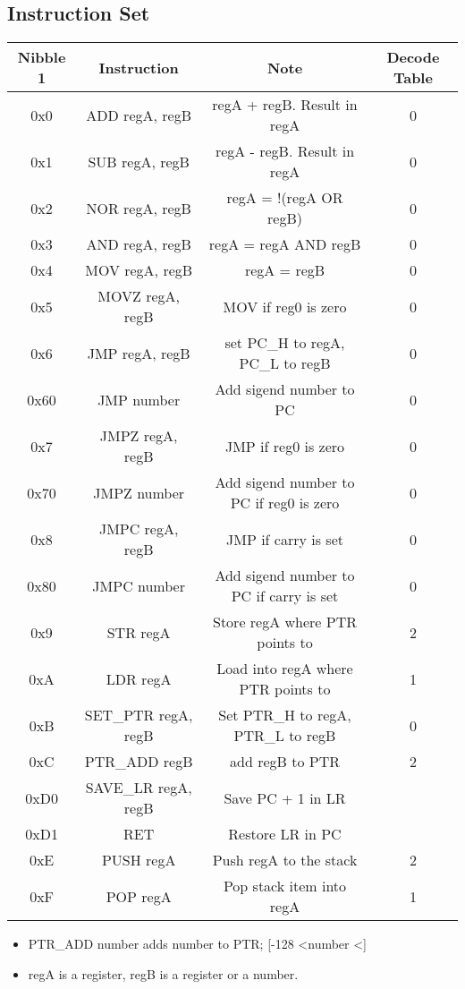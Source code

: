 \documentclass[a4paper, 12pt]{article}
\begin{document}
\begin{center}
		\subsection{Instruction Set}
		\begin{tabular}{|c|c|c|c|}
			\hline
			Nibble 1 & Instruction & Note & Decode Table\\ \hline
			0x0 & ADD regA, regB & regA + regB. Result in regA & 0\\ \hline
			0x1 & SUB regA, regB & regA - regB. Result in regA & 0 \\ \hline
			0x2 & NOR regA, regB & regA = !(regA OR regB) & 0 \\ \hline
			0x3 & AND regA, regB & regA = regA AND regB & 0\\ \hline
			0x4 & MOV regA, regB & regA = regB & 0\\ \hline
			0x5 & MOVZ regA, regB & MOV if reg0 is zero &  0\\ \hline
			0x6 & JMP regA, regB & set PC\_H to regA, PC\_L to regB & 0\\ \hline
			0x60 & JMP number & Add sigend number to PC & 0\\ \hline
			0x7 & JMPZ regA, regB & JMP if reg0 is zero & 0\\ \hline
			0x70 & JMPZ number & Add sigend number to PC if reg0 is zero & 0\\ \hline
			0x8 & JMPC regA, regB & JMP if carry is set & 0\\ \hline
			0x80 & JMPC number & Add sigend number to PC if carry is set & 0\\ \hline
			0x9 & STR regA & Store regA where PTR points to & 2\\ \hline
			0xA & LDR regA & Load into regA where PTR points to & 1\\ \hline
			0xB & SET\_PTR regA, regB & Set PTR\_H to regA, PTR\_L to regB & 0\\ \hline
			0xC & PTR\_ADD regB & add regB to PTR & 2\\ \hline
			0xD0 & SAVE\_LR regA, regB & Save PC + 1 in LR &   \\ \hline
			0xD1 & RET & Restore LR in PC &   \\ \hline
			0xE & PUSH regA & Push regA to the stack & 2\\ \hline
			0xF & POP regA & Pop stack item into regA & 1\\	\hline
		\end{tabular}	
		\begin{itemize}
			\item PTR\_ADD number adds number to PTR; [-128 \textless \space number \textless {}]
			\item regA is a register, regB is a register or a number.\newline
		\end{itemize}
	\end{center}
	\newpage
\end{document}
